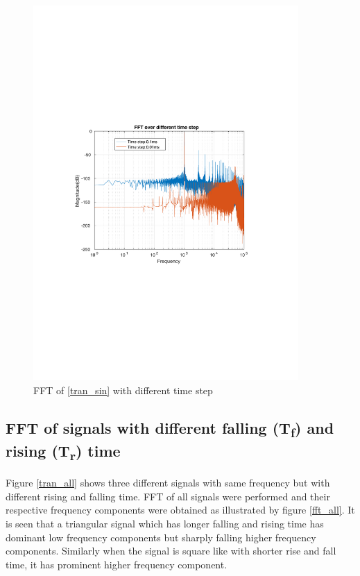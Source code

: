 \documentclass[12pt,a4paper,UKenglish]{article}
\begin{document}
\begin{figure} [H]
  \centering 
  \includegraphics[width=0.9\textwidth]{img/2a.pdf} 
  \caption{FFT of \ref{tran_sin} with different time step}
  \label{fft_sin} 
\end{figure}


\subsection{FFT of signals with different falling (T\textsubscript{f}) and rising (T\textsubscript{r}) time}
Figure \ref{tran_all} shows three different signals with same frequency but with different rising and falling time. FFT of all signals were performed and their respective frequency components were obtained as illustrated by figure \ref{fft_all}. It is seen that a triangular signal which has longer falling and rising time has dominant low frequency components but sharply falling higher frequency components. Similarly when the signal is square like with shorter rise and fall time, it has prominent higher frequency component. 
\end{document}
